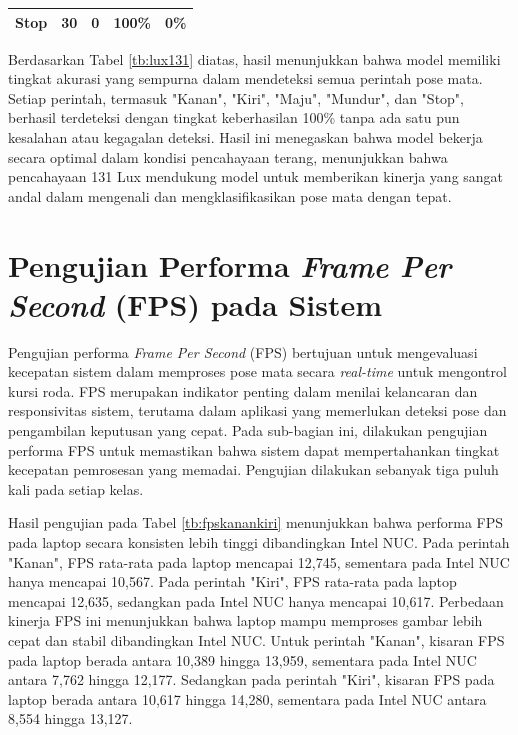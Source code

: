 \begin{longtable}{|l|c|c|c|c|}
  Stop           & 30                                                                                           & 0                                                                                                 & 100\%                                                                                            & 0\%                                                                                                  \\ \hline
\end{longtable}

Berdasarkan Tabel \ref{tb:lux131} diatas, hasil menunjukkan bahwa model memiliki tingkat akurasi yang sempurna dalam mendeteksi semua perintah pose mata. Setiap perintah, termasuk "Kanan", "Kiri", "Maju", "Mundur", dan "Stop", berhasil terdeteksi dengan tingkat keberhasilan 100\% tanpa ada satu pun kesalahan atau kegagalan deteksi. Hasil ini menegaskan bahwa model bekerja secara optimal dalam kondisi pencahayaan terang, menunjukkan bahwa pencahayaan 131 Lux mendukung model untuk memberikan kinerja yang sangat andal dalam mengenali dan mengklasifikasikan pose mata dengan tepat.

\section{Pengujian Performa \emph{Frame Per Second} (FPS) pada Sistem}

Pengujian performa \emph{Frame Per Second} (FPS) bertujuan untuk mengevaluasi kecepatan sistem dalam memproses pose mata secara \emph{real-time} untuk mengontrol kursi roda. FPS merupakan indikator penting dalam menilai kelancaran dan responsivitas sistem, terutama dalam aplikasi yang memerlukan deteksi pose dan pengambilan keputusan yang cepat. Pada sub-bagian ini, dilakukan pengujian performa FPS untuk memastikan bahwa sistem dapat mempertahankan tingkat kecepatan pemrosesan yang memadai. Pengujian dilakukan sebanyak tiga puluh kali pada setiap kelas.

Hasil pengujian pada Tabel \ref{tb:fpskanankiri} menunjukkan bahwa performa FPS pada laptop secara konsisten lebih tinggi dibandingkan Intel NUC. Pada perintah "Kanan", FPS rata-rata pada laptop mencapai 12,745, sementara pada Intel NUC hanya mencapai 10,567. Pada perintah "Kiri", FPS rata-rata pada laptop mencapai 12,635, sedangkan pada Intel NUC hanya mencapai 10,617. Perbedaan kinerja FPS ini menunjukkan bahwa laptop mampu memproses gambar lebih cepat dan stabil dibandingkan Intel NUC. Untuk perintah "Kanan", kisaran FPS pada laptop berada antara 10,389 hingga 13,959, sementara pada Intel NUC antara 7,762 hingga 12,177. Sedangkan pada perintah "Kiri", kisaran FPS pada laptop berada antara 10,617 hingga 14,280, sementara pada Intel NUC antara 8,554 hingga 13,127.


